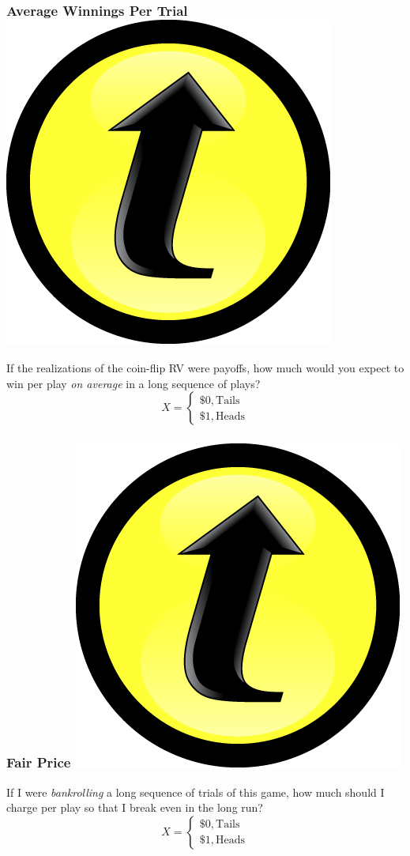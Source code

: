 \documentclass[handout]{beamer}
\begin{document}

\begin{frame}
\frametitle{Average Winnings Per Trial \hfill \includegraphics[scale = 0.05]{./images/clicker}}
If the realizations of the coin-flip RV were \alert{payoffs}, how much would you expect to win per play \emph{on average} in a long sequence of plays?
$$X = \left\{ \begin{array}{l}  \$0, \mbox{Tails}\\ \$1, \mbox{Heads}\end{array} \right.$$
\end{frame}

\begin{frame}
\frametitle{Fair Price \hfill \includegraphics[scale = 0.05]{./images/clicker}}
If I were \emph{bankrolling} a long sequence of trials of this game, how much should I charge per play so that I break even in the long run?
$$X = \left\{ \begin{array}{l}  \$0, \mbox{Tails}\\ \$1, \mbox{Heads}\end{array} \right.$$
\end{frame}
\end{document}
